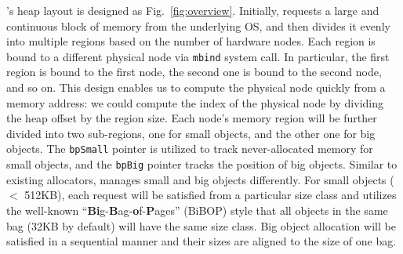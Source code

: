 \NM{}'s heap layout is designed as  Fig.~\ref{fig:overview}. Initially, \NM{} requests a large and continuous block of memory from the underlying OS, and then divides it evenly into multiple regions based on the number of hardware nodes. Each region is bound to a different physical node via \texttt{mbind} system call. 
In particular, the first region is bound to the first node, the second one is bound to the second node, and so on. This design enables us to compute the physical node quickly from a memory address: we could compute the index of the physical node by dividing the heap offset by the region size. 
Each node's memory region will be further divided into two sub-regions, one for small objects, and the other one for big objects. The \texttt{bpSmall} pointer is utilized to track never-allocated memory
for small objects, and the \texttt{bpBig} pointer tracks the position of big objects. Similar to existing allocators, \NM{} manages small and big objects differently. 
For small objects ($<$ 512KB), each request will be satisfied from a particular size class
and \NM{} utilizes the well-known ``\textbf{Bi}g-\textbf{B}ag-\textbf{o}f-\textbf{P}ages'' (BiBOP) style that all objects in the same bag (32KB by default) will have the same size class. 
Big object allocation will be satisfied in a sequential manner and their sizes are aligned to the size of one bag.

